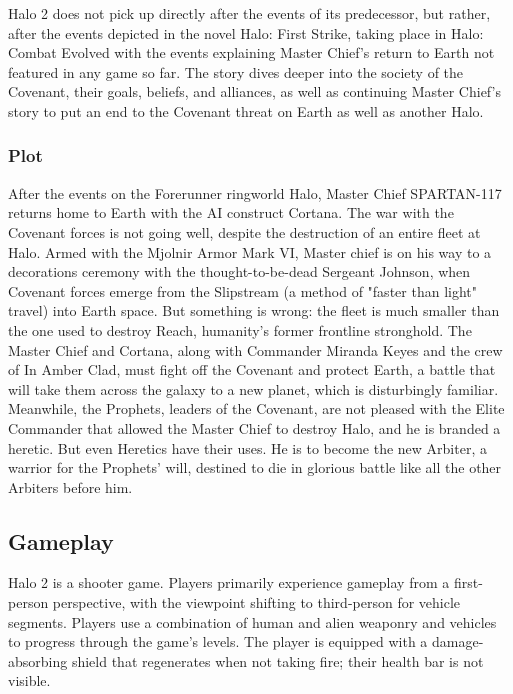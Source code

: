 \documentclass[a4paper,10pt]{book}
\begin{document}
          Halo 2 does not pick up directly after the events of its predecessor, but rather, after the events depicted in the novel Halo: First Strike, taking place in Halo:
          Combat Evolved with the events explaining Master Chief's return to Earth not featured in any game so far. The story dives deeper into the society of the Covenant,
          their goals, beliefs, and alliances, as well as continuing Master Chief's story to put an end to the Covenant threat on Earth as well as another Halo. 
         
 
 \subsubsection{Plot }
 
          After the events on the Forerunner ringworld Halo, Master Chief SPARTAN-117 returns home to Earth with the AI construct Cortana.
          The war with the Covenant forces is not going well, despite the destruction of an entire fleet at Halo.
          Armed with the Mjolnir Armor Mark VI, Master chief is on his way to a decorations ceremony with the thought-to-be-dead Sergeant Johnson, when Covenant forces emerge 
          from the Slipstream (a method of "faster than light" travel) into Earth space.
          But something is wrong: the fleet is much smaller than the one used to destroy Reach, humanity's former frontline stronghold. The Master Chief and Cortana,
          along with Commander Miranda Keyes and the crew of In Amber Clad, must fight off the Covenant and protect Earth, a battle that will take them across the galaxy to a new planet,
          which is disturbingly familiar. Meanwhile, the Prophets, leaders of the Covenant, are not pleased with the Elite Commander that allowed the Master Chief to destroy Halo, and he is branded a heretic.
          But even Heretics have their uses. He is to become the new Arbiter, a warrior for the Prophets' will, destined to die in glorious battle like all the other Arbiters before him.
         
 
 \subsection{ Gameplay }
 
          Halo 2 is a shooter game. Players primarily experience gameplay from a first-person perspective, with the viewpoint shifting to third-person for vehicle segments.
          Players use a combination of human and alien weaponry and vehicles to progress through the game's levels. The player is equipped with a damage-absorbing shield that
          regenerates when not taking fire; their health bar is not visible.
         
\end{document}
